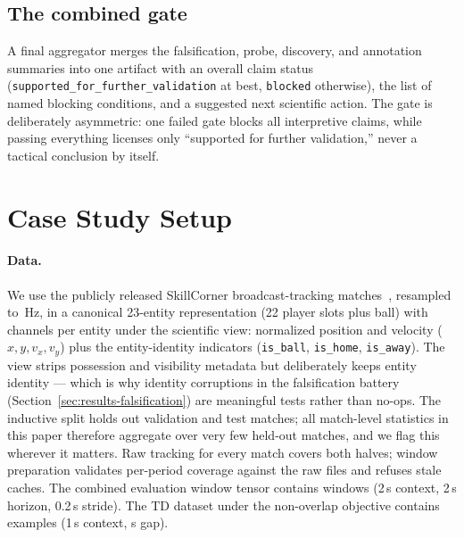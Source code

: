 \documentclass{article}
\begin{document}
\subsection{The combined gate}
\label{sec:protocol-gate}

A final aggregator merges the falsification, probe, discovery, and annotation
summaries into one artifact with an overall claim status
(\texttt{supported\_for\_further\_validation} at best, \texttt{blocked}
otherwise), the list of named blocking conditions, and a suggested next
scientific action. The gate is deliberately asymmetric: one failed gate blocks
all interpretive claims, while passing everything licenses only ``supported
for further validation,'' never a tactical conclusion by itself.

\section{Case Study Setup}
\label{sec:setup}

\paragraph{Data.}
We use the \NumMatches{} publicly released SkillCorner broadcast-tracking
matches~\citep{skillcorner2020opendata}, resampled to \FpsOut{}\,Hz, in a
canonical 23-entity representation (22 player slots plus ball) with
\FeatureCount{} channels per entity under the scientific view: normalized
position and velocity ($x, y, v_x, v_y$) plus the entity-identity indicators
(\texttt{is\_ball}, \texttt{is\_home}, \texttt{is\_away}). The view strips
possession and visibility metadata but deliberately keeps entity identity ---
which is why identity corruptions in the falsification battery
(Section~\ref{sec:results-falsification}) are meaningful tests rather than
no-ops. The inductive split holds out \NumValMatches{} validation and
\NumTestMatches{} test matches; all match-level statistics in this paper
therefore aggregate over very few held-out matches, and we flag this
wherever it matters. Raw
tracking for every match covers both halves; window preparation validates
per-period coverage against the raw files and refuses stale caches. The
combined evaluation window tensor contains \NumWindows{} windows
(2\,s context, 2\,s horizon, 0.2\,s stride). The TD dataset under the
non-overlap objective contains \NumTdExamples{} examples (1\,s context,
\PredictionGapSeconds{}s gap).
\end{document}
